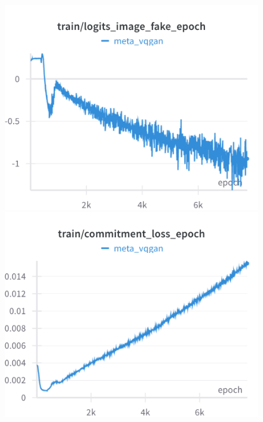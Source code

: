 \begin{figure}[H]
\includegraphics[width=\linewidth]{detailed_engineering/Meta VQGAN/charts/Section-2-Panel-10-l680emjha}
\caption{}
\endminipage\hfill
{}
\includegraphics[width=\linewidth]{detailed_engineering/Meta VQGAN/charts/Section-2-Panel-11-4ox8mpc2c}
\caption{}
\endminipage
\end{figure}

